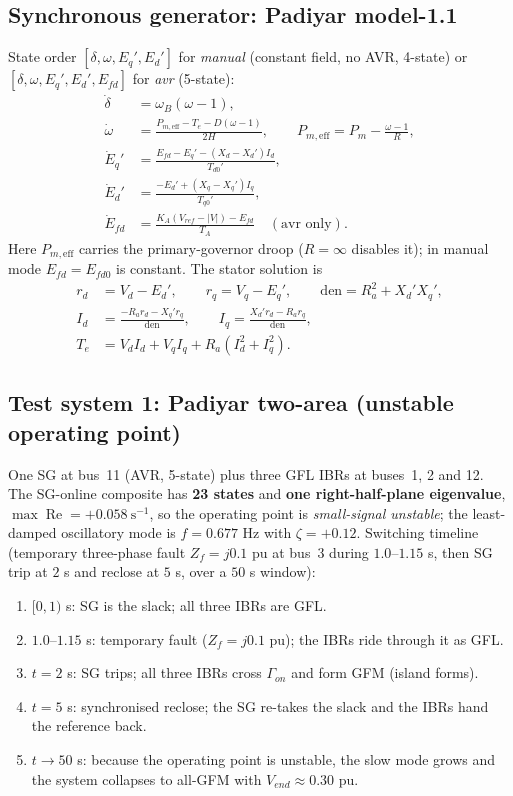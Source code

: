 \documentclass[12pt,a4paper]{article}
\begin{document}
\subsection{Synchronous generator: Padiyar model-1.1}
State order $[\delta,\omega,E_q',E_d']$ for \emph{manual} (constant field, no AVR, 4-state) or
$[\delta,\omega,E_q',E_d',E_{fd}]$ for \emph{avr} (5-state):
\begin{align}
\dot{\delta} &= \omega_B(\omega-1),\\
\dot{\omega} &= \frac{P_{m,\mathrm{eff}}-T_e-D(\omega-1)}{2H},\qquad
                P_{m,\mathrm{eff}}=P_m-\frac{\omega-1}{R},\\
\dot{E}_q' &= \frac{E_{fd}-E_q'-(X_d-X_d')I_d}{T_{d0}'},\\
\dot{E}_d' &= \frac{-E_d'+(X_q-X_q')I_q}{T_{q0}'},\\
\dot{E}_{fd} &= \frac{K_A(V_{ref}-|V|)-E_{fd}}{T_A}\quad(\text{avr only}).
\end{align}
Here $P_{m,\mathrm{eff}}$ carries the primary-governor droop ($R=\infty$ disables it); in manual
mode $E_{fd}=E_{fd0}$ is constant. The stator solution is
\begin{align}
r_d &= V_d-E_d',\qquad r_q = V_q-E_q',\qquad \mathrm{den}=R_a^2+X_d'X_q',\\
I_d &= \frac{-R_a r_d - X_q' r_q}{\mathrm{den}},\qquad
      I_q = \frac{X_d' r_d - R_a r_q}{\mathrm{den}},\\
T_e &= V_d I_d+V_q I_q+R_a(I_d^2+I_q^2).
\end{align}

\subsection{Test system 1: Padiyar two-area (unstable operating point)}
One SG at bus~11 (AVR, 5-state) plus three GFL IBRs at buses~1, 2 and 12. The SG-online composite
has \textbf{23 states} and \textbf{one right-half-plane eigenvalue},
$\max\operatorname{Re}=+0.058\ \mathrm{s^{-1}}$, so the operating point is \emph{small-signal
unstable}; the least-damped oscillatory mode is $f=0.677$ Hz with $\zeta=+0.12$. Switching
timeline (temporary three-phase fault $Z_f=j0.1$ pu at bus~3 during $1.0$--$1.15$ s, then SG trip
at $2$ s and reclose at $5$ s, over a $50$ s window):
\begin{enumerate}
\item $[0,1)$ s: SG is the slack; all three IBRs are GFL.
\item $1.0$--$1.15$ s: temporary fault ($Z_f=j0.1$ pu); the IBRs ride through it as GFL.
\item $t=2$ s: SG trips; all three IBRs cross $\Gamma_{on}$ and form GFM (island forms).
\item $t=5$ s: synchronised reclose; the SG re-takes the slack and the IBRs hand the reference back.
\item $t\to50$ s: because the operating point is unstable, the slow mode grows and the system
collapses to all-GFM with $V_{end}\approx0.30$ pu.
\end{enumerate}
\end{document}
